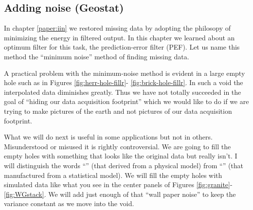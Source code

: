 \subsection{Adding noise (Geostat)}
In chapter \ref{paper:iin} we restored missing data
by adopting the philosopy of minimizing the energy in filtered output.
In this chapter we learned about an optimum filter
for this task, the prediction-error filter (PEF).
Let us name this method the ``minimum noise'' method
of finding missing data.

\par
A practical problem with the minimum-noise method is evident
in a large empty hole such as 
in Figures \ref{fig:herr-hole-fillr}-
\ref{fig:brick-hole-fillr}.
In such a void the interpolated data diminishes greatly.
Thus we have not totally succeeded in the goal of
``hiding our data acquisition footprint''
which we would like to do if we are trying to make
pictures of the earth and not pictures of our
data acquisition footprint.

\par
What we will do next is useful in some applications but not in others.
Misunderstood or misused it is rightly controversial.
We are going to fill the empty holes
with something that looks like the original data but really isn't.
I will distinguish the words ``''
(that derived from a physical model)
from ``'' (that manufactured from a statistical model).
We will fill the empty holes with simulated data
like what you see in the center panels of Figures
\ref{fig:granite}-\ref{fig:WGstack}.
We will add just enough of that ``wall paper noise'' to keep
the variance constant as we move into the void.

